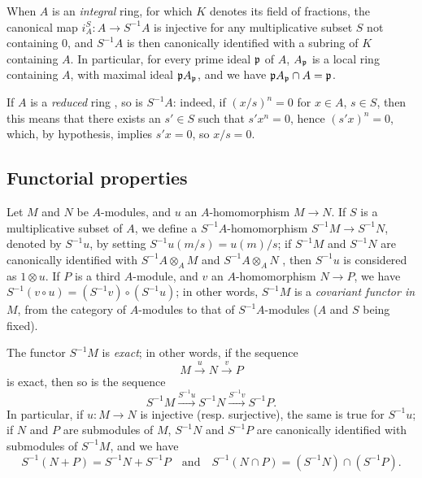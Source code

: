 \begin{env}[1.2.7]
\label{0.1.2.7}
When $A$ is an \emph{integral} ring, for which $K$ denotes its field of
fractions, the canonical map $i_A^S:A\to S^{-1}A$ is injective for any
multiplicative subset $S$ not containing $0$, and $S^{-1}A$ is then canonically identified
with a subring of $K$ containing $A$. In particular, for every prime
ideal $\mathfrak{p}$ of $A$, $A_\mathfrak{p}$ is a local ring containing $A$,
with maximal ideal $\mathfrak{p}A_\mathfrak{p}$, and we have
$\mathfrak{p}A_\mathfrak{p}\cap A=\mathfrak{p}$.
\end{env}

\begin{env}[1.2.8]
\label{0.1.2.8}
If $A$ is a \emph{reduced} ring , so is $S^{-1}A$: indeed, if
$(x/s)^n=0$ for $x\in A$, $s\in S$, then this means that there exists an
$s'\in S$ such that $s' x^n=0$, hence $(s' x)^n=0$, which, by hypothesis, implies
$s' x=0$, so $x/s=0$.
\end{env}

\subsection{Functorial properties}
\label{subsection-func-ring-of-fractions}

\begin{env}[1.3.1]
\label{0.1.3.1}
Let $M$ and $N$ be $A$-modules, and $u$ an $A$-homomorphism $M\to N$. If $S$ is a
multiplicative subset of $A$, we define a $S^{-1}A$-homomorphism
$S^{-1}M\to S^{-1}N$, denoted by $S^{-1}u$, by setting $S^{-1}u(m/s)=u(m)/s$; if
$S^{-1}M$ and $S^{-1}N$ are canonically identified with $S^{-1}A\otimes_A M$ and
$S^{-1}A\otimes_A N$ , then $S^{-1}u$ is considered as $1\otimes u$.
If $P$ is a third $A$-module, and $v$ an $A$-homomorphism $N\to P$, we have
$S^{-1}(v\circ u)=(S^{-1}v)\circ(S^{-1}u)$; in other words, $S^{-1}M$ is a
\emph{covariant functor in $M$}, from the category of $A$-modules to that of
$S^{-1}A$-modules ($A$ and $S$ being fixed).
\end{env}

\begin{env}[1.3.2]
\label{0.1.3.2}
The functor $S^{-1}M$ is \emph{exact}; in other words, if the sequence
\[
  M\xrightarrow{u}N\xrightarrow{v}P
\]
is exact, then so is the sequence
\[
  S^{-1}M\xrightarrow{S^{-1}u}S^{-1}N\xrightarrow{S^{-1}v}S^{-1}P.
\]
In particular, if $u:M\to N$ is injective (resp. surjective), the same is true
for $S^{-1}u$;
if $N$ and $P$ are submodules of $M$, $S^{-1}N$ and $S^{-1}P$ are canonically identified with submodules of $S^{-1}M$, and we have
\[
  S^{-1}(N+P)=S^{-1}N+S^{-1}P
  \quad\text{and}\quad
  S^{-1}(N\cap P)=(S^{-1}N)\cap(S^{-1}P).
\]
\end{env}

